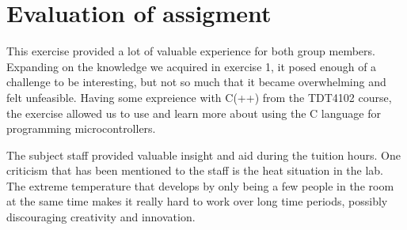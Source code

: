\chapter{Evaluation of assigment}

This exercise provided a lot of valuable experience for both group members. Expanding on the knowledge we acquired in exercise 1, it posed enough of a challenge to be interesting, but not so much that it became overwhelming and felt unfeasible. Having some expreience with C(++) from the TDT4102 course, the exercise allowed us to use and learn more about using the C language for programming microcontrollers.

The subject staff provided valuable insight and aid during the tuition hours. One criticism that has been mentioned to the staff is the heat situation in the lab. The extreme temperature that develops by only being a few people in the room at the same time makes it really hard to work over long time periods, possibly discouraging creativity and innovation.
